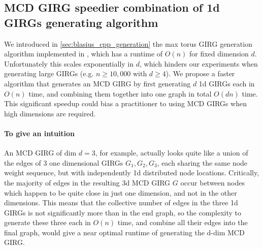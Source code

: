 







\subsection{MCD GIRG speedier combination of 1d GIRGs generating algorithm}
We introduced in \cref{sec:blasius_cpp_generation} the max torus GIRG generation algorithm implemented in \cite{blasius2022efficiently}, which has a runtime of $O(n)$ for fixed dimension $d$. Unfortunately this scales exponentially in $d$, which hinders our experiments when generating large GIRGs (e.g. $n \geq 10,000$ with $d \geq 4$).
We propose a faster algorithm that generates an MCD GIRG by first generating $d$ 1d GIRGs each in $O(n)$ time, and combining them together into one graph in total $O(dn)$ time. This significant speedup could bias a practitioner to using MCD GIRGs when high dimensions are required.

\paragraph{To give an intuition} An MCD GIRG of dim $d=3$, for example, actually looks quite like a union of the edges of $3$ one dimensional GIRGs $G_1, G_2, G_3$, each sharing the same node weight sequence, but with independently 1d distributed node locations. Critically, the majority of edges in the resulting 3d MCD GIRG $G$ occur between nodes which happen to be quite close in just one dimension, and not in the other dimensions. This means that the collective number of edges in the three 1d GIRGs is not significantly more than in the end graph, so the complexity to generate these three each in $O(n)$ time, and combine all their edges into the final graph, would give a near optimal runtime of generating the d-dim MCD GIRG.

